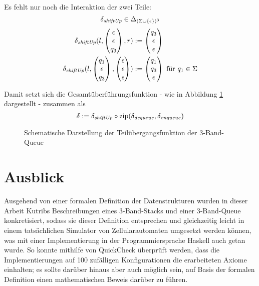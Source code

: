 \documentclass{article}
\DeclareMathOperator{\zip}{zip}
\begin{document}
Es fehlt nur noch die Interaktion der zwei Teile:
\[ \delta_\mathit{shiftUp} \in \Delta_{(\Sigma \cup \{\epsilon\})^3} \]
\begin{align*}
    \delta_\mathit{shiftUp}(l,\begin{pmatrix}\epsilon\\\epsilon\\q_3\end{pmatrix},r) &:= \begin{pmatrix}q_3\\\epsilon\\\epsilon\end{pmatrix} \\
    \delta_\mathit{shiftUp}(l,\begin{pmatrix}q_1\\\epsilon\\q_3\end{pmatrix},\begin{pmatrix}\epsilon\\\epsilon\\\epsilon\end{pmatrix}) &:= \begin{pmatrix}q_1\\q_3\\\epsilon\end{pmatrix} \text{ für } q_1 \in \Sigma
\end{align*}

Damit setzt sich die Gesamtüberführungsfunktion - wie in Abbildung \ref{fig3tapequeue} dargestellt - zusammen als
\[ \delta := \delta_\shiftUp \circ \zip(\delta_\dequeue,\delta_\enqueue) \]
\begin{figure}[h]
    \centering
    \caption{Schematische Darstellung der Teilübergangsfunktion der 3-Band-Queue}
    \label{fig3tapequeue}
\end{figure}

\newpage
\section{Ausblick}
Ausgehend von einer formalen Definition der Datenstrukturen wurden in dieser Arbeit Kutribs Beschreibungen eines 3-Band-Stacks und einer 3-Band-Queue konkretisiert, sodass sie dieser Definition entsprechen und gleichzeitig leicht in einem tatsächlichen Simulator von Zellularautomaten umgesetzt werden können, was mit einer Implementierung in der Programmiersprache Haskell auch getan wurde. So konnte mithilfe von QuickCheck überprüft werden, dass die Implementierungen auf 100 zufälligen Konfigurationen die erarbeiteten Axiome einhalten; es sollte darüber hinaus aber auch möglich sein, auf Basis der formalen Definition einen mathematischen Beweis darüber zu führen.
\end{document}
